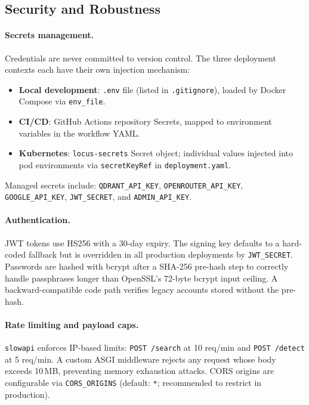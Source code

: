\documentclass[12pt]{article}
\begin{document}
\subsection{Security and Robustness}

\paragraph{Secrets management.}
Credentials are never committed to version control. The three deployment contexts each have their own injection mechanism:
\begin{itemize}[leftmargin=*, itemsep=2pt]
  \item \textbf{Local development}: \texttt{.env} file (listed in \texttt{.gitignore}), loaded by Docker Compose via \texttt{env\_file}.
  \item \textbf{CI/CD}: GitHub Actions repository Secrets, mapped to environment variables in the workflow YAML.
  \item \textbf{Kubernetes}: \texttt{locus-secrets} Secret object; individual values injected into pod environments via \texttt{secretKeyRef} in \texttt{deployment.yaml}.
\end{itemize}
Managed secrets include: \texttt{QDRANT\_API\_KEY}, \texttt{OPENROUTER\_API\_KEY}, \texttt{GOOGLE\_API\_KEY}, \texttt{JWT\_SECRET}, and \texttt{ADMIN\_API\_KEY}.

\paragraph{Authentication.}
JWT tokens use HS256 with a 30-day expiry. The signing key defaults to a hard-coded fallback but is overridden in all production deployments by \texttt{JWT\_SECRET}. Passwords are hashed with bcrypt after a SHA-256 pre-hash step to correctly handle passphrases longer than OpenSSL's 72-byte bcrypt input ceiling. A backward-compatible code path verifies legacy accounts stored without the pre-hash.

\paragraph{Rate limiting and payload caps.}
\texttt{slowapi} enforces IP-based limits: \texttt{POST /search} at 10 req/min and \texttt{POST /detect} at 5 req/min. A custom ASGI middleware rejects any request whose body exceeds 10\,MB, preventing memory exhaustion attacks. CORS origins are configurable via \texttt{CORS\_ORIGINS} (default: \texttt{*}; recommended to restrict in production).
\end{document}
